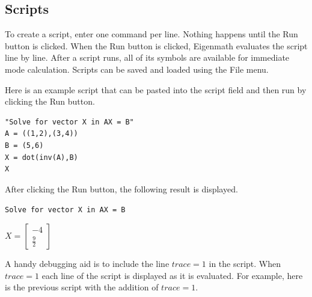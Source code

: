 \subsection{Scripts}

\begin{center}
\end{center}

\noindent
To create a script, enter one command per line.
Nothing happens until the Run button is clicked. When the Run button is
clicked, Eigenmath evaluates the script line by line. After a script runs,
all of its symbols are available for immediate mode calculation.
Scripts can be saved and loaded using the File menu.

\bigskip
\noindent
Here is an example script that can be pasted into the script field
and then run by clicking the Run button.

\begin{Verbatim}[formatcom=\color{blue}]
"Solve for vector X in AX = B"
A = ((1,2),(3,4))
B = (5,6)
X = dot(inv(A),B)
X
\end{Verbatim}

\noindent
After clicking the Run button, the following result is displayed.

\bigskip
\noindent
\verb$Solve for vector X in AX = B$

\bigskip
\noindent
$\displaystyle X=\begin{bmatrix}-4\\ \frac{9}{2}\end{bmatrix}$

\bigskip
\noindent
A handy debugging aid is to include the line $trace=1$ in the script.
When $trace=1$ each line of the script is displayed as it is evaluated.
For example, here is the previous script with the addition of
$trace=1$.

